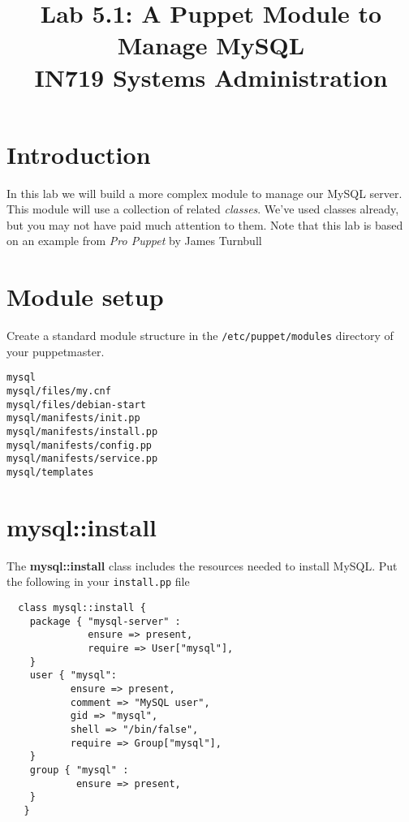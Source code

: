 \documentclass{article}   	%
\title{Lab 5.1: A Puppet Module to Manage MySQL \\ IN719 Systems Administration}
\date{}							%
\begin{document}
\maketitle

\section*{Introduction}
In this lab we will build a more complex module to manage our MySQL server.  This module will use a collection of related \emph{classes}.  We've used classes already, but you may not have paid much attention to them.  Note that this lab is based on an example from \emph{Pro Puppet} by James Turnbull

\section{Module setup}
Create a standard module structure in the \texttt{/etc/puppet/modules} directory of your puppetmaster.

\texttt{mysql} \\
\texttt{mysql/files/my.cnf} \\
\texttt{mysql/files/debian-start} \\
\texttt{mysql/manifests/init.pp} \\
\texttt{mysql/manifests/install.pp} \\
\texttt{mysql/manifests/config.pp} \\
\texttt{mysql/manifests/service.pp} \\
\texttt{mysql/templates} \\



\section{mysql::install}
The \textbf{mysql::install} class includes the resources needed to install MySQL.  Put the following in your \texttt{install.pp} file

\begin{verbatim}
  class mysql::install {
    package { "mysql-server" :
              ensure => present,
              require => User["mysql"],
    }
    user { "mysql":
           ensure => present,
           comment => "MySQL user",
           gid => "mysql",
           shell => "/bin/false",
           require => Group["mysql"],
    }
    group { "mysql" :
            ensure => present,
    }
   }

\end{verbatim}
\end{document}
